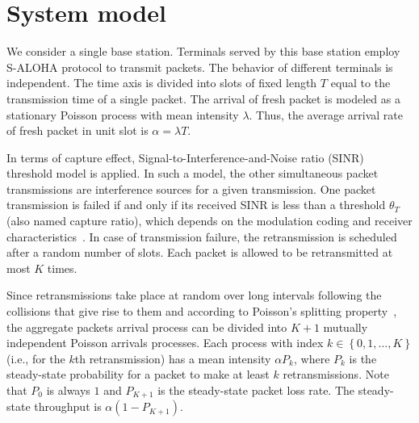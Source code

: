 \section{System model}
\label{sec:icc17-system-model}
We consider a single base station. 
Terminals served by this base station employ S-ALOHA protocol to transmit packets. 
The behavior of different terminals is independent.
The time axis is divided into slots of fixed length $T$ equal to the transmission time of a single packet. 
The arrival of fresh packet is modeled as a stationary Poisson process with mean intensity $\lambda$. 
Thus, the average arrival rate of fresh packet in unit slot is $\alpha = \lambda T$. 

In terms of capture effect, Signal-to-Interference-and-Noise ratio (SINR) threshold model is applied. 
In such a model, the other simultaneous packet transmissions are interference sources for a given transmission. 
One packet transmission is failed if and only if its received SINR is less than a threshold $\theta_{T}$ (also named capture ratio), which depends on the modulation coding and receiver characteristics~\cite{dardari2000capacity}. 
In case of transmission failure, the retransmission is scheduled after a random number of slots. 
Each packet is allowed to be retransmitted at most $K$ times. 

Since retransmissions take place at random over long intervals following the collisions that give rise to them and according to Poisson's splitting property~\cite{meyn2012markov}, the aggregate packets arrival process can be divided into $K+1$ mutually independent Poisson arrivals processes. Each process with index $k\in \left\lbrace 0,1, ..., K\right\rbrace$ (i.e., for the $k$th retransmission) has a mean intensity $\alpha P_k$, where $P_k$ is the steady-state probability for a packet to make at least $k$ retransmissions. Note that $P_0$ is always $1$ and $P_{K+1}$ is the steady-state packet loss rate. The steady-state throughput is $\alpha\left( 1 - P_{K+1}\right)$. 

